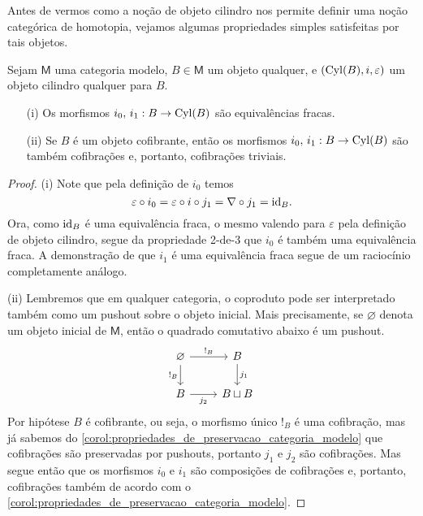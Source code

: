 Antes de vermos como a noção de objeto cilindro nos permite definir uma noção categórica de homotopia, vejamos algumas propriedades simples satisfeitas por tais objetos.

\begin{lema}\label{lema:propriedades_objeto_cilindro}
  Sejam $\mathsf{M}$ uma categoria modelo, $B \in \mathsf{M}$ um objeto qualquer, e $(\mathrm{Cyl}(B),i,\varepsilon)$ um objeto cilindro qualquer para $B$.
  \begin{enumerate}
  \item[(i)] Os morfismos $i_{0},\, i_{1}: B \to \mathrm{Cyl}(B)$ são equivalências fracas.
    
  \item[(ii)] Se $B$ é um objeto cofibrante, então os morfismos $i_{0},\, i_{1}: B \to \mathrm{Cyl}(B)$ são também cofibrações e, portanto, cofibrações triviais.
  \end{enumerate}
\end{lema}

\begin{proof}
  (i) Note que pela definição de $i_{0}$ temos
  \begin{displaymath}
    \varepsilon \circ i_{0} = \varepsilon \circ i \circ j_{1} = \nabla \circ j_{1} = \mathrm{id}_{B}.
  \end{displaymath}
  Ora, como $\mathrm{id}_{B}$ é uma equivalência fraca, o mesmo valendo para $\varepsilon$ pela definição de objeto cilindro, segue da propriedade 2-de-3 que $i_{0}$ é também uma equivalência fraca.
  A demonstração de que $i_{1}$ é uma equivalência fraca segue de um raciocínio completamente análogo.

  \smallskip
  (ii) Lembremos que em qualquer categoria, o coproduto pode ser interpretado também como um pushout sobre o objeto inicial.
  Mais precisamente, se $\varnothing$ denota um objeto inicial de $\mathsf{M}$, então o quadrado comutativo abaixo é um pushout.
  \begin{displaymath}
    \begin{tikzcd}
      \varnothing
      \arrow[r, "!_{B}"]
      \arrow[d, "!_{B}" swap]
      & B
      \arrow[d, "j_{1}"]
      \\ B
      \arrow[r, "j_{2}" swap]
      & B \sqcup B
    \end{tikzcd}
  \end{displaymath}
  Por hipótese $B$ é cofibrante, ou seja, o morfismo único $!_{B}$ é uma cofibração, mas já sabemos do \cref{corol:propriedades_de_preservacao_categoria_modelo} que cofibrações são preservadas por pushouts, portanto $j_{1}$ e $j_{2}$ são cofibrações.
  Mas segue então que os morfismos $i_{0}$ e $i_{1}$ são composições de cofibrações e, portanto, cofibrações também de acordo com o \cref{corol:propriedades_de_preservacao_categoria_modelo}.
\end{proof}

